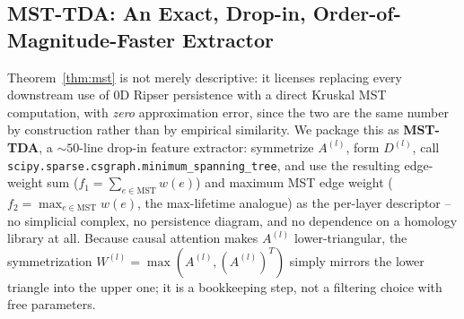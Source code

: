 \documentclass{article}
\begin{document}
\subsection{MST-TDA: An Exact, Drop-in, Order-of-Magnitude-Faster Extractor}
\label{sec:mst-tda}
Theorem~\ref{thm:mst} is not merely descriptive: it licenses replacing every downstream use of $0$D Ripser persistence with a direct Kruskal MST computation, with \emph{zero} approximation error, since the two are the same number by construction rather than by empirical similarity. We package this as \textbf{MST-TDA}, a $\sim\!50$-line drop-in feature extractor: symmetrize $A^{(l)}$, form $D^{(l)}$, call \texttt{scipy.sparse.csgraph.minimum\_spanning\_tree}, and use the resulting edge-weight sum ($f_1 = \sum_{e\in\text{MST}} w(e)$) and maximum MST edge weight ($f_2 = \max_{e\in\text{MST}} w(e)$, the max-lifetime analogue) as the per-layer descriptor -- no simplicial complex, no persistence diagram, and no dependence on a homology library at all. Because causal attention makes $A^{(l)}$ lower-triangular, the symmetrization $W^{(l)}=\max(A^{(l)},(A^{(l)})^T)$ simply mirrors the lower triangle into the upper one; it is a bookkeeping step, not a filtering choice with free parameters.
\end{document}
